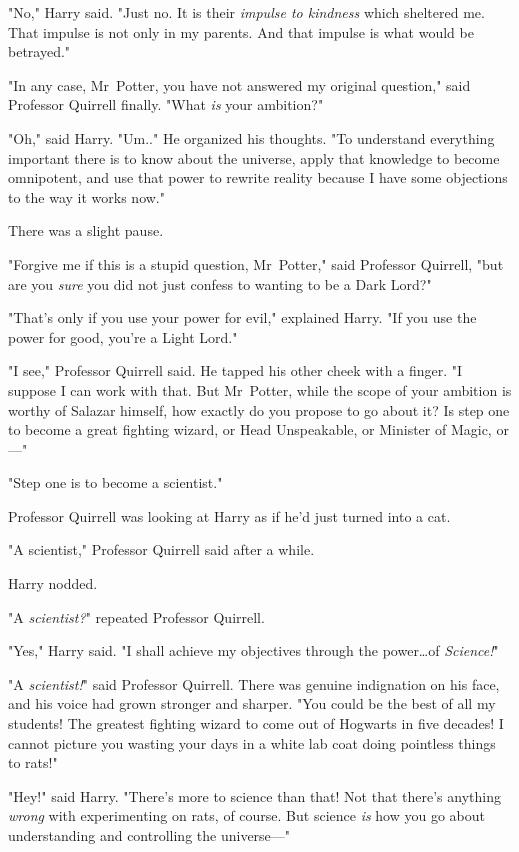 "No," Harry said. "Just no. It is their \emph{impulse to kindness} which
sheltered me. That impulse is not only in my parents. And that impulse is what
would be betrayed."

"In any case, Mr~Potter, you have not answered my original question," said
Professor Quirrell finally. "What \emph{is} your ambition?"

"Oh," said Harry. "Um.." He organized his thoughts. "To understand everything
important there is to know about the universe, apply that knowledge to become
omnipotent, and use that power to rewrite reality because I have some
objections to the way it works now."

There was a slight pause.

"Forgive me if this is a stupid question, Mr~Potter," said Professor Quirrell,
"but are you \emph{sure} you did not just confess to wanting to be a Dark Lord?"

"That's only if you use your power for evil," explained Harry. "If you use the
power for good, you're a Light Lord."

"I see," Professor Quirrell said. He tapped his other cheek with a finger. "I
suppose I can work with that. But Mr~Potter, while the scope of your ambition
is worthy of Salazar himself, how exactly do you propose to go about it? Is
step one to become a great fighting wizard, or Head Unspeakable, or Minister of
Magic, or—"

"Step one is to become a scientist."

Professor Quirrell was looking at Harry as if he'd just turned into a cat.

"A scientist," Professor Quirrell said after a while.

Harry nodded.

"A \emph{scientist?}" repeated Professor Quirrell.

"Yes," Harry said. "I shall achieve my objectives through the power…of
\emph{Science!}"

"A \emph{scientist!}" said Professor Quirrell. There was genuine indignation on
his face, and his voice had grown stronger and sharper. "You could be the best
of all my students! The greatest fighting wizard to come out of Hogwarts in
five decades! I cannot picture you wasting your days in a white lab coat doing
pointless things to rats!"

"Hey!" said Harry. "There's more to science than that! Not that there's
anything \emph{wrong} with experimenting on rats, of course. But science
\emph{is} how you go about understanding and controlling the universe—"

